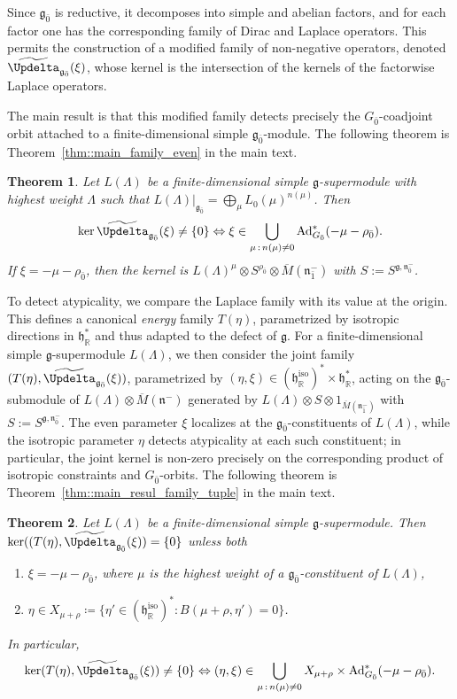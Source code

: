 \documentclass[11pt]{amsart}
\def\RR{{\mathbb R}}
\def\hh{{\mathfrak h}}
\def\even{{\mathfrak{g}_{\bar{0}}}}
\def\nn {{\mathfrak{n}}}
\def\gg{{\mathfrak{g}}}
\newcommand{\Ad}{\operatorname{Ad}}
\theoremstyle{plain}
\newtheorem{theorem}{Theorem}
\theoremstyle{remark}
\theoremstyle{definition}
\numberwithin{equation}{section}
\theoremstyle{remark}
\begin{document}
Since $\even$ is reductive, it decomposes into simple and abelian factors, and for each factor one has the corresponding family of Dirac and Laplace operators. This permits the construction of a modified family of non-negative operators, denoted $\widetilde{\Updelta}_{\even}(\xi)$, whose kernel is the intersection of the kernels of the factorwise Laplace operators.

The main result is that this modified family detects precisely the $G_{\bar 0}$-coadjoint orbit attached to a finite-dimensional simple $\even$-module. The following theorem is Theorem~\ref{thm::main_family_even} in the main text.

\begin{theorem}
 Let $L(\Lambda)$ be a finite-dimensional simple $\gg$-supermodule with highest weight $\Lambda$ such that $L(\Lambda)\big\vert_{\even}=\bigoplus_{\mu} L_{0}(\mu)^{n(\mu)}$. Then 
 \[
 \ker \widetilde{\Updelta}_{\even}(\xi) \neq \{0\} \Leftrightarrow \xi \in \bigcup_{\mu \,:\, n(\mu)\neq 0}\Ad_{G_{\bar{0}}}^{\ast}(-\mu-\rho_{\bar{0}}).
 \]
 If $\xi=- \mu-\rho_{\bar{0}}$, then the kernel is $L(\Lambda)^{\mu}\otimes S^{\rho_{\bar{0}}} \otimes \overline{M}(\nn_{\bar{1}}^{-})$ with $S := S^{\gg, \nn_{\bar{0}}^{-}}$.
\end{theorem}

To detect atypicality, we compare the Laplace family with its value at the origin. This defines a canonical \emph{energy} family $T(\eta)$, parametrized by isotropic directions in $\hh_{\RR}^{\ast}$ and thus adapted to the defect of $\gg$. For a finite-dimensional simple $\gg$-supermodule $L(\Lambda)$, we then consider the joint family $(T(\eta),\widetilde{\Updelta}_{\even}(\xi))$, parametrized by $(\eta,\xi)\in (\hh_{\RR}^{\mathrm{iso}})^{\ast}\times\hh_{\RR}^{\ast}$, acting on the $\even$-submodule of $L(\Lambda)\otimes \overline{M}(\nn^{-})$ generated by $L(\Lambda)\otimes S\otimes 1_{\overline{M}(\nn_{\bar{1}}^{-})}$ with $S := S^{\gg,\nn_{\bar{0}}^{-}}$. The even parameter $\xi$ localizes at the $\even$-constituents of $L(\Lambda)$, while the isotropic parameter $\eta$ detects atypicality at each such constituent; in particular, the joint kernel is non-zero precisely on the corresponding product of isotropic constraints and $G_{\bar 0}$-orbits. The following theorem is Theorem~\ref{thm::main_resul_family_tuple} in the main text.

\begin{theorem}
Let $L(\Lambda)$ be a finite-dimensional simple $\gg$-supermodule. Then
$\ker((T(\eta),\widetilde{\Updelta}_{\even}(\xi))=\{0\}$ unless \emph{both}
\begin{enumerate}
\item[a)] $\xi=-\mu-\rho_{\bar{0}}$, where $\mu$ is the highest weight of a $\even$-constituent of $L(\Lambda)$,
\item[b)] $\eta\in X_{\mu+\rho}\coloneqq \{\eta' \in (\hh_{\RR}^{\text{iso}})^{\ast} : B(\mu+\rho, \eta')=0\}$.
\end{enumerate}
In particular,
\[
\ker (T(\eta), \widetilde{\Updelta}_{\even}(\xi)) \neq \{0\} \Leftrightarrow (\eta,\xi) \in \bigcup_{\mu\,:\,n(\mu)\neq 0}X_{\mu+\rho} \times \Ad_{G_{\bar{0}}}^{\ast}(-\mu-\rho_{\bar{0}}).
\]
\end{theorem}
\end{document}
